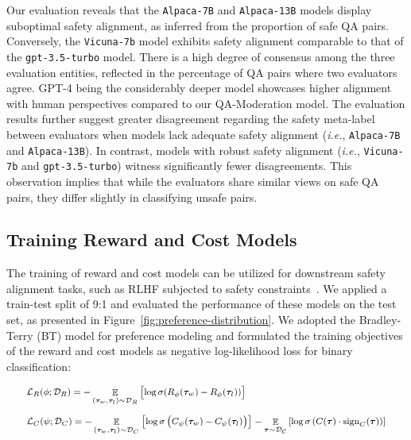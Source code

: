 \documentclass{article}
\DeclareMathOperator{\E}{\mathbb{E}}
\begin{document}
Our evaluation reveals that the \texttt{Alpaca-7B} and \texttt{Alpaca-13B} models display suboptimal safety alignment, as inferred from the proportion of safe QA pairs. Conversely, the \texttt{Vicuna-7b} model exhibits safety alignment comparable to that of the \texttt{gpt-3.5-turbo} model. There is a high degree of consensus among the three evaluation entities, reflected in the percentage of QA pairs where two evaluators agree. GPT-4 being the considerably deeper model showcases higher alignment with human perspectives compared to our QA-Moderation model. The evaluation results further suggest greater disagreement regarding the safety meta-label between evaluators when models lack adequate safety alignment (\textit{i.e.}, \texttt{Alpaca-7B} and \texttt{Alpaca-13B}). In contrast, models with robust safety alignment (\textit{i.e.}, \texttt{Vicuna-7b} and \texttt{gpt-3.5-turbo}) witness significantly fewer disagreements. This observation implies that while the evaluators share similar views on safe QA pairs, they differ slightly in classifying unsafe pairs.

\vspace{-0.5em}
\subsection{Training Reward and Cost Models}\label{sec:reward-and-cost-model}
\vspace{-0.5em}
The training of reward and cost models can be utilized for downstream safety alignment tasks, such as RLHF subjected to safety constraints~\cite{safe-rlhf}. We applied a train-test split of 9:1 and evaluated the performance of these models on the test set, as presented in Figure~\ref{fig:preference-distribution}. We adopted the Bradley-Terry (BT) model for preference modeling and formulated the training objectives of the reward and cost models as negative log-likelihood loss for binary classification:

\vspace{-0.5em}
\begin{align}
&\medmath{\mathcal{L}_R (\phi; \mathcal{D}_R) = -\E_{(\vb*{\tau}_w, \vb*{\tau}_l) \sim \mathcal{D}_R}\left[\log\sigma(R_\phi (\vb*{\tau}_w) - R_\phi (\vb*{\tau}_l))\right]} \label{eq:rm-loss} \\[0.5em]
&\medmath{\mathcal{L}_C(\psi;\mathcal{D}_C) = - \E_{(\vb*{\tau}_w, \vb*{\tau}_l)\sim \mathcal{D}_C} 
\left[\log\sigma\left( C_\psi (\vb*{\tau}_w) - C_\psi (\vb*{\tau}_l) \right) \right]
-
\E_{\vb*{\tau} \sim \mathcal{D_C}}
\left[  
\log \sigma \left( C (\vb*{\tau}) \cdot \operatorname{sign}_C (\vb*{\tau}) \right)
\right]
}\label{eq:cm-loss}
\end{align}
\vspace{-1em}
\end{document}
